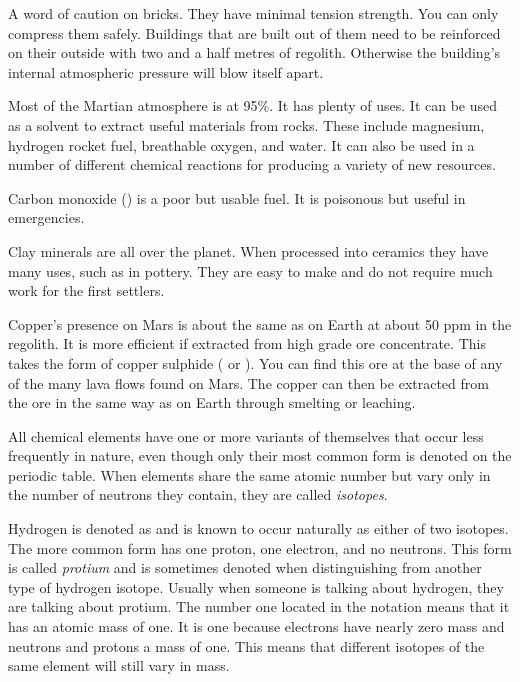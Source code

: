 A word of caution on bricks. They have minimal tension strength. You can only compress them safely. Buildings that are built out of them need to be reinforced on their outside with two and a half metres of regolith. Otherwise the building's internal atmospheric pressure will blow itself apart.

Most of the Martian atmosphere is  at 95\%. It has plenty of uses. It can be used as a solvent to extract useful materials from rocks. These include magnesium, hydrogen rocket fuel, breathable oxygen, and water. It can also be used in a number of different chemical reactions for producing a variety of new resources.

Carbon monoxide () is a poor but usable fuel. It is poisonous but useful in emergencies.

Clay minerals are all over the planet. When processed into ceramics they have many uses, such as in pottery. They are easy to make and do not require much work for the first settlers.

Copper's presence on Mars is about the same as on Earth at about 50 ppm in the regolith. It is more efficient if extracted from high grade ore concentrate. This takes the form of copper sulphide ( or ). You can find this ore at the base of any of the many lava flows found on Mars. The copper can then be extracted from the ore in the same way as on Earth through smelting or leaching.

All chemical elements have one or more variants of themselves that occur less frequently in nature, even though only their most common form is denoted on the periodic table. When elements share the same atomic number but vary only in the number of neutrons they contain, they are called {\it isotopes}.

Hydrogen is denoted as  and is known to occur naturally as either of two isotopes. The more common form has one proton, one electron, and no neutrons. This form is called {\it protium} and is sometimes denoted  when distinguishing from another type of hydrogen isotope. Usually when someone is talking about hydrogen, they are talking about protium. The number one located in the notation means that it has an atomic mass of one. It is one because electrons have nearly zero mass and neutrons and protons a mass of one. This means that different isotopes of the same element will still vary in mass.

